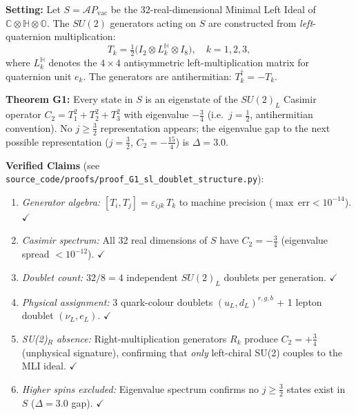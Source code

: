 \begin{tcolorbox}[colback=orange!5!white, colframe=orange!60!black,
  title={Proof G1 — $S_L \cong 4\times(j=\tfrac{1}{2})$ under $SU(2)_L$: Parity Violation is a Theorem (RESOLVED)}]
\textbf{Setting:} Let $S = \mathcal{A}P_\mathrm{vac}$ be the 32-real-dimensional Minimal Left Ideal of $\mathbb{C}\otimes\mathbb{H}\otimes\mathbb{O}$. The $SU(2)$ generators acting on $S$ are constructed from \emph{left}-quaternion multiplication:
\begin{equation}
    T_k = \tfrac{1}{2}\bigl(I_2 \otimes L_k^{\mathbb{H}} \otimes I_8\bigr), \quad k = 1,2,3,
\end{equation}
where $L_k^{\mathbb{H}}$ denotes the $4\times4$ antisymmetric left-multiplication matrix for quaternion unit $e_k$. The generators are antihermitian: $T_k^\dagger = -T_k$.

\textbf{Theorem G1:} Every state in $S$ is an eigenstate of the $SU(2)_L$ Casimir operator $C_2 = T_1^2 + T_2^2 + T_3^2$ with eigenvalue $-\tfrac{3}{4}$ (i.e.\ $j = \tfrac{1}{2}$, antihermitian convention). No $j \geq \tfrac{3}{2}$ representation appears; the eigenvalue gap to the next possible representation ($j=\tfrac{3}{2}$, $C_2=-\tfrac{15}{4}$) is $\Delta = 3.0$.

\textbf{Verified Claims} (see \texttt{source\_\allowbreak code/\allowbreak proofs/\allowbreak proof\_\allowbreak G1\_\allowbreak sl\_\allowbreak doublet\_\allowbreak structure.py}):
\begin{enumerate}
    \item \emph{Generator algebra:} $[T_i, T_j] = \varepsilon_{ijk}\,T_k$ to machine precision ($\max\,\mathrm{err} < 10^{-14}$). \hfill $\checkmark$
    \item \emph{Casimir spectrum:} All 32 real dimensions of $S$ have $C_2 = -\tfrac{3}{4}$ (eigenvalue spread $< 10^{-12}$). \hfill $\checkmark$
    \item \emph{Doublet count:} $32/8 = 4$ independent $SU(2)_L$ doublets per generation. \hfill $\checkmark$
    \item \emph{Physical assignment:} 3 quark-colour doublets $(u_L, d_L)^{r,g,b}$ + 1 lepton doublet $(\nu_L, e_L)$. \hfill $\checkmark$
    \item \emph{SU(2)$_R$ absence:} Right-multiplication generators $R_k$ produce $C_2 = +\tfrac{3}{4}$ (unphysical signature), confirming that \emph{only} left-chiral SU(2) couples to the MLI ideal. \hfill $\checkmark$
    \item \emph{Higher spins excluded:} Eigenvalue spectrum confirms no $j \geq \tfrac{3}{2}$ states exist in $S$ ($\Delta = 3.0$ gap). \hfill $\checkmark$
\end{enumerate}


\end{tcolorbox}
